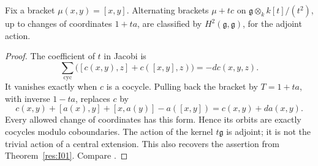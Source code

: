 \begin{proposition}\label{res:I02}
Fix a bracket \(\mu(x,y)=[x,y]\). Alternating brackets
\(\mu+t c\) on \(\mathfrak g\otimes_k k[t]/(t^2)\), up to changes of
coordinates \(1+t a\), are classified by
\(H^2(\mathfrak g,\mathfrak g)\), for the adjoint action.
\end{proposition}
\begin{proof}
The coefficient of \(t\) in Jacobi is
\[
 \sum_{\mathrm{cyc}}\bigl([c(x,y),z]+c([x,y],z)\bigr)=-dc(x,y,z).
\]
It vanishes exactly when \(c\) is a cocycle. Pulling back the bracket
by \(T=1+t a\), with inverse \(1-t a\), replaces \(c\) by
\[
 c(x,y)+[a(x),y]+[x,a(y)]-a([x,y])=c(x,y)+da(x,y).
\]
Every allowed change of coordinates has this form. Hence its orbits
are exactly cocycles modulo coboundaries. The action of the kernel
\(t\mathfrak g\) is adjoint; it is not the trivial action of a central
extension. This also recovers the assertion from
Theorem~\ref{res:I01}. Compare \cite[Proposition 48.5]{etingof}.
\end{proof}


